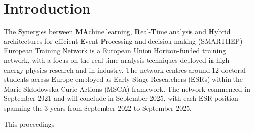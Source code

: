 \section{Introduction}
\label{intro}
The \textbf{S}ynergies between \textbf{MA}chine learning, \textbf{R}eal-\textbf{T}ime analysis and \textbf{H}ybrid architectures for efficient \textbf{E}vent \textbf{P}rocessing and decision making (SMARTHEP) European Training Network is a European Union Horizon-funded training network, with a focus on the real-time analysis techniques deployed in high energy physics research and in industry. The network centres around 12 doctoral students across Europe employed as Early Stage Researchers (ESRs) within the Marie Sk{\l}odowska-Curie Actions (MSCA) framework. The network commenced in September 2021 and will conclude in September 2025, with each ESR position spanning the 3 years from September 2022 to September 2025.\par
This proceedings